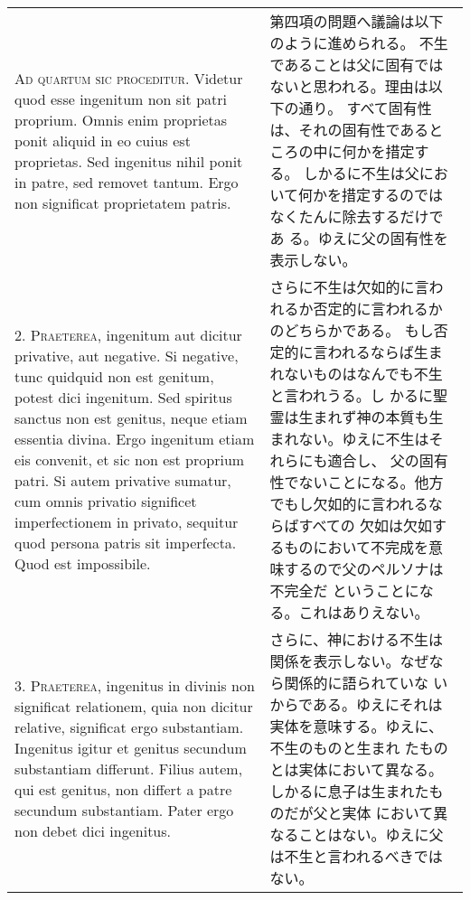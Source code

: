 \documentclass[10pt]{jsarticle} %
\begin{document}
\begin{longtable}{p{21em}p{21em}}

{\scshape Ad quartum sic proceditur}. Videtur quod esse ingenitum non sit patri
proprium. Omnis enim proprietas ponit aliquid in eo cuius est
proprietas. Sed ingenitus nihil ponit in patre, sed removet
tantum. Ergo non significat proprietatem patris.


&

第四項の問題へ議論は以下のように進められる。
不生であることは父に固有ではないと思われる。理由は以下の通り。
すべて固有性は、それの固有性であるところの中に何かを措定する。
しかるに不生は父において何かを措定するのではなくたんに除去するだけであ
 る。ゆえに父の固有性を表示しない。

\\



2. {\scshape Praeterea}, ingenitum aut dicitur privative, aut negative. Si negative,
tunc quidquid non est genitum, potest dici ingenitum. Sed spiritus
sanctus non est genitus, neque etiam essentia divina. Ergo ingenitum
etiam eis convenit, et sic non est proprium patri. Si autem privative
sumatur, cum omnis privatio significet imperfectionem in privato,
sequitur quod persona patris sit imperfecta. Quod est impossibile.


&

さらに不生は欠如的に言われるか否定的に言われるかのどちらかである。
もし否定的に言われるならば生まれないものはなんでも不生と言われうる。し
 かるに聖霊は生まれず神の本質も生まれない。ゆえに不生はそれらにも適合し、
 父の固有性でないことになる。他方でもし欠如的に言われるならばすべての
 欠如は欠如するものにおいて不完成を意味するので父のペルソナは不完全だ
 ということになる。これはありえない。



\\



3. {\scshape Praeterea}, ingenitus in divinis non significat relationem, quia non
dicitur relative, significat ergo substantiam. Ingenitus igitur et
genitus secundum substantiam differunt. Filius autem, qui est genitus,
non differt a patre secundum substantiam. Pater ergo non debet dici
ingenitus.


&

さらに、神における不生は関係を表示しない。なぜなら関係的に語られていな
 いからである。ゆえにそれは実体を意味する。ゆえに、不生のものと生まれ
 たものとは実体において異なる。しかるに息子は生まれたものだが父と実体
 において異なることはない。ゆえに父は不生と言われるべきではない。


\end{longtable}
\end{document}
